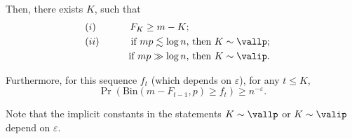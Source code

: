 \begin{lemma}
        \noindent
        Then, there exists \(K\), such that 
        \begin{equation}
        \label{eq:cover_size}
        \begin{aligned}
            &(i) \qquad &F_K \geq m - K; \\
            &(ii) \qquad &\text{if } mp \lesssim \log n, &\text{ then } K \sim \vallp; \\
            & \qquad \quad \  &\text{if } mp \gg \log n, &\text{ then } K \sim \valip.
        \end{aligned}
        \end{equation} 
        
        \noindent
        Furthermore, for this sequence \(f_t\) (which depends on \(\varepsilon\)), for any \(t \leq K\),
        \begin{equation}
            \Pr (\mathrm{Bin}(m - F_{t - 1}, p) \geq f_t) \geq n^{-\varepsilon}.
        \end{equation} 
    
    \noindent
        Note that the implicit constants in the statements \(K \sim \vallp\) or \(K \sim \valip\) depend on \(\varepsilon\).
    \end{lemma}

